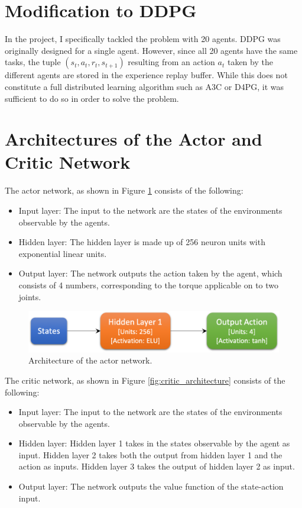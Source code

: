 \documentclass[12pt,twoside]{article}
\begin{document}
\newpage

\section{Modification to DDPG}
In the project, I specifically tackled the problem with 20 agents. DDPG was originally designed for a single agent. However, since all 20 agents have the same tasks, the tuple $(s_t, a_t, r_t, s_{t+1})$ resulting from an action $a_t$ taken by the different agents are stored in the experience replay buffer. While this does not constitute a full distributed learning algorithm such as A3C or D4PG, it was sufficient to do so in order to solve the problem.

\section{Architectures of the Actor and Critic Network}

The actor network, as shown in Figure \ref{fig:actor_architecture} consists of the following:
	\begin{itemize}
		\item Input layer: The input to the network are the states of the environments observable by the agents.
		\item Hidden layer: The hidden layer is made up of 256 neuron units with exponential linear units.
		\item Output layer: The network outputs the action taken by the agent, which consists of 4 numbers, corresponding to the torque applicable on to two joints.
	\end{itemize}


\begin{figure}[H]
	\begin{center}
		\includegraphics[width = 0.625\hsize]{./figures/Actor.png} 
		\caption{Architecture of the actor network.} %
		\label{fig:actor_architecture} %
	\end{center}
\end{figure}

The critic network, as shown in Figure \ref{fig:critic_architecture} consists of the following:
	\begin{itemize}
		\item Input layer: The input to the network are the states of the environments observable by the agents.
		\item Hidden layer: Hidden layer 1 takes in the states observable by the agent as input. Hidden layer 2 takes both the output from hidden layer 1 and the action as inputs. Hidden layer 3 takes the output of hidden layer 2 as input.
		\item Output layer: The network outputs the value function of the state-action input.
	\end{itemize}
	
\end{document}
